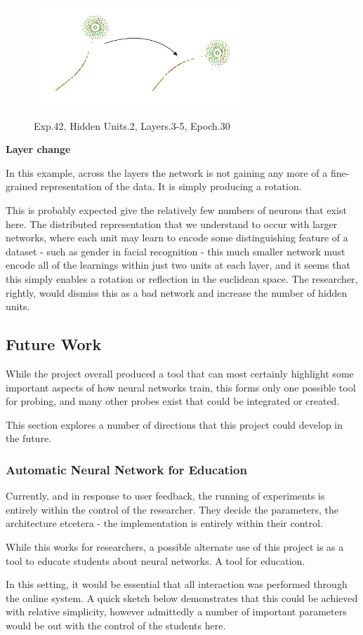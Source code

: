 \documentclass[a4paper,11pt,titlepage]{article}
\begin{document}
	\begin{figure}[H]
    			\centering	
			{{\includegraphics[width=0.7\textwidth]
    				{img/conc-X42_H2_L3-5_E30.png} 
    			}}%
    			\caption{Exp.42, Hidden Units.2, Layers.3-5, Epoch.30}%
    		\label{fig:mnistHinton}
	\end{figure}
	
	\textbf{Layer change}
	\par 
	In this example, across the layers the network is not gaining any more of a fine-grained representation of the data. It is simply producing a rotation.
	\par 
	This is probably expected give the relatively few numbers of neurons that exist here. The distributed representation that we understand to occur with larger networks, where each unit may learn to encode some distinguishing feature of a dataset - such as gender in facial recognition - this much smaller network must encode all of the learnings within just two units at each layer, and it seems that this simply enables a rotation or reflection in the euclidean space. The researcher, rightly, would dismiss this as a bad network and increase the number of hidden units.

\subsection{Future Work}
	While the project overall produced a tool that can most certainly highlight some important aspects of how neural networks train, this forms only one possible tool for probing, and many other probes exist that could be integrated or created.
	\par 
	This section explores a number of directions that this project could develop in the future.

	\subsubsection{Automatic Neural Network for Education}		
	Currently, and in response to user feedback, the running of experiments is entirely within the control of the researcher. They decide the parameters, the architecture etcetera - the implementation is entirely within their control.
	\par 
	While this works for researchers, a possible alternate use of this project is as a tool to educate students about neural networks. A tool for education.
	\par 
	In this setting, it would be essential that all interaction was performed through the online system. A quick sketch below demonstrates that this could be achieved with relative simplicity, however admittedly a number of important parameters would be out with the control of the students here.
	
\end{document}
